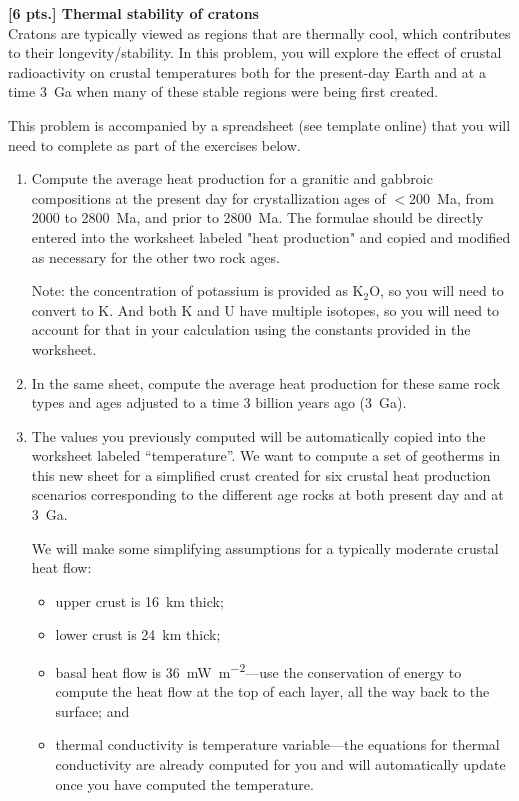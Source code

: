 \item \label{itm:rad} {\bf [6 pts.] Thermal stability of cratons} \\
Cratons are typically viewed as regions that are thermally cool, which
contributes to their longevity/stability.  In this problem, you will explore the
effect of crustal radioactivity on crustal temperatures both for the present-day
Earth and at a time \SI{3}{Ga} when many of these stable regions were being first
created.

This problem is accompanied by a spreadsheet (see template online) that you will
need to complete as part of the exercises below.
\begin{enumerate}
    \item Compute the average heat production for a granitic and gabbroic
        compositions at the present day for crystallization ages of $<$\SI{200}{Ma},
        from 2000 to \SI{2800}{Ma}, and prior to \SI{2800}{Ma}.  The formulae should be
        directly entered into the worksheet labeled "heat production" and copied
        and modified as necessary for the other two rock ages.
        
        Note: the concentration of potassium is provided as K$_2$O, so you will
        need to convert to K.  And both K and U have multiple isotopes, so you
        will need to account for that in your calculation using the constants
        provided in the worksheet.

    \item In the same sheet, compute the average heat production for these same
        rock types and ages adjusted to a time 3 billion years ago (\SI{3}{Ga}).

    \item The values you previously computed will be automatically copied into
        the worksheet labeled ``temperature''.  We want to compute a set of
        geotherms in this new sheet for a simplified crust created for six
        crustal heat production scenarios corresponding to the different age
        rocks at both present day and at \SI{3}{Ga}.

        We will make some simplifying assumptions for a typically moderate
        crustal heat flow:
        \begin{itemize}
            \item upper crust is \SI{16}{km} thick; 
            \item lower crust is \SI{24}{km} thick;
            \item basal heat flow is \SI{36}{mW.m^{-2}}---use the conservation of
                energy to compute the heat flow at the top of each layer, all
                the way back to the surface; and
            \item thermal conductivity is temperature variable---the equations
                for thermal conductivity are already computed for you and will
                automatically update once you have computed the temperature.
        \end{itemize}


\end{enumerate}
